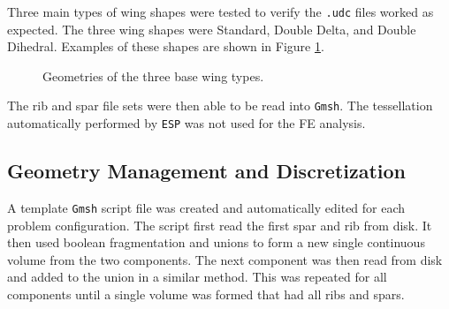 \documentclass[conf]{new-aiaa}
\begin{document}
Three main types of wing shapes were tested to verify the \texttt{.udc} 
files worked as expected.
The three wing shapes were Standard, Double Delta, and Double Dihedral. 
Examples of these shapes are shown in Figure \ref{fig:no_internals}.

\begin{figure}[H]
  \centering
  \caption{
      Geometries of the three base wing types.}
  \label{fig:no_internals}
\end{figure}

\noindent
The rib and spar file sets were then able to be read into \texttt{Gmsh}.
The tessellation automatically performed by \texttt{ESP} was not used 
for the FE analysis.

\subsection{Geometry Management and Discretization} \label{sec:meth_geom}
A template \texttt{Gmsh} script file was created and automatically 
edited for each problem configuration.
The script first read the first spar and rib from disk.
It then used boolean fragmentation and unions to form a new 
single continuous volume from the two components. 
The next component was then read from disk and added to the union
in a similar method. 
This was repeated for all components until a single volume was formed
that had all ribs and spars.
\end{document}
